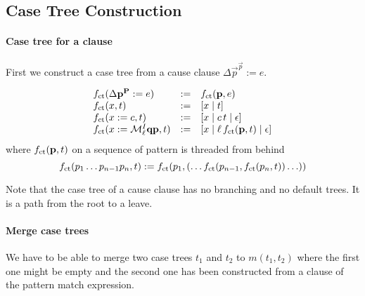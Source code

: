 \subsection{Case Tree Construction}

\paragraph{Case tree for a clause}
First we construct a case tree from a cause clause
$\Delta \vec p^{\Vec p} := e$.

$$
\begin{array}{lll}
    f_\text{ct}(\Delta {\mathbf p}^{{\mathbf P}} := e) &:=& f_\text{ct}({\mathbf p}, e)
    \\
    f_\text{ct}(x, t) &:=& [x \mid t]
    \\
    f_\text{ct}(x := c, t) &:=& [x \mid c\, t \mid \epsilon ]
    \\
    f_\text{ct}(x := {\cal M}^I_\ell {\mathbf q} {\mathbf p}, t)
                   &:=&
                   [x \mid \ell\, f_\text{ct}({\mathbf p}, t) \mid \epsilon ]
\end{array}
$$
%
where $f_\text{ct}({\mathbf p}, t)$ on a sequence of pattern is threaded from behind
%
$$
f_\text{ct}(p_1 \ldots p_{n-1} p_n, t)
:=
f_\text{ct}(p_1, (\ldots f_\text{ct}(p_{n-1}, f_\text{ct}(p_n, t))\ldots))
$$


Note that the case tree of a cause clause has no branching and no default trees.
It is a path from the root to a leave.



\paragraph{Merge case trees} We have to be able to merge two case trees $t_1$
and $t_2$ to $m(t_1, t_2)$ where the first one might be empty and the second one
has been constructed from a clause of the pattern match expression.

